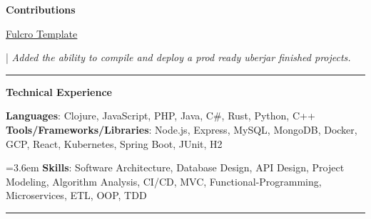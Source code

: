 \documentclass[letterpaper,11pt]{article}
\begin{document}
\textbf{\large \textcolor{magic_blue}{Contributions}}

\begin{minipage}[t]{0.1 \textwidth}
	\raggedright
	\href{https://github.com/fulcrologic/fulcro-template}{\underline{Fulcro Template}}
\end{minipage}
\hfill
\begin{minipage}[t]{0.8\textwidth}
	\raggedright
	|\textit{ Added the ability to compile and deploy a prod ready uberjar finished projects. } \\
\end{minipage}

\noindent\rule{19.5cm}{0.4pt}

%
\textbf{\large \textcolor{magic_blue}{Technical Experience} }
\begin{onehalfspace}

	\textbf{ Languages}{: Clojure, JavaScript, PHP, Java, C\#, Rust, Python, C++ } \\

	\textbf{ Tools/Frameworks/Libraries}{: Node.js, Express, MySQL, MongoDB, Docker, GCP, React, Kubernetes, Spring Boot, JUnit, H2 } \\
\end{onehalfspace}

\hangindent=3.6em
\textbf{ Skills}{: }
Software Architecture, Database Design, API Design, 
Project Modeling, Algorithm Analysis, CI/CD,
MVC, Functional-Programming, Microservices, ETL, OOP, 
TDD

\noindent\rule{19.5cm}{0.4pt}

\end{document}
